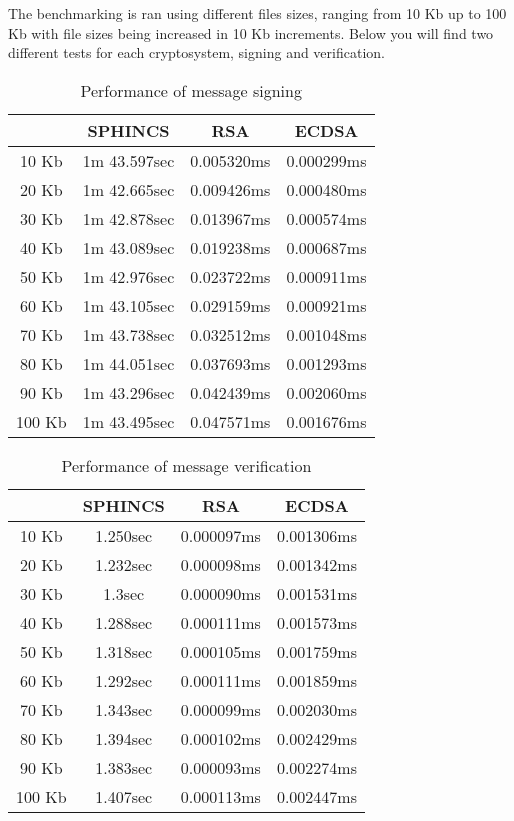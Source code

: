 \documentclass[]{scrartcl}
\begin{document}
The benchmarking is ran using different files sizes, ranging from 10 Kb up to 100 Kb with file sizes being increased in 10 Kb increments. Below you will find two different tests for each cryptosystem, signing and verification.

\begin{table} [H]
	\centering
	\caption{Performance of message signing}
	\begin{tabular}{|c|c|c|c|}
		\hline 
		& SPHINCS & RSA & ECDSA \\ 
		\hline 
		10 Kb & 1m 43.597sec & 0.005320ms & 0.000299ms \\ 
		\hline 
		20 Kb & 1m 42.665sec & 0.009426ms & 0.000480ms \\ 
		\hline 
		30 Kb & 1m 42.878sec & 0.013967ms & 0.000574ms \\ 
		\hline 
		40 Kb & 1m 43.089sec & 0.019238ms & 0.000687ms \\ 
		\hline 
		50 Kb & 1m 42.976sec & 0.023722ms & 0.000911ms \\ 
		\hline 
		60 Kb & 1m 43.105sec & 0.029159ms & 0.000921ms \\ 
		\hline 
		70 Kb & 1m 43.738sec & 0.032512ms & 0.001048ms \\ 
		\hline 
		80 Kb & 1m 44.051sec & 0.037693ms & 0.001293ms \\ 
		\hline 
		90 Kb & 1m 43.296sec & 0.042439ms & 0.002060ms \\ 
		\hline 
		100 Kb & 1m 43.495sec & 0.047571ms & 0.001676ms \\ 
		\hline 
	\end{tabular} 
\end{table}

\begin{table} [H]
	\centering
	\caption{Performance of message verification}
	\begin{tabular}{|c|c|c|c|}
		\hline 
		& SPHINCS & RSA & ECDSA \\ 
		\hline 
		10 Kb & 1.250sec & 0.000097ms & 0.001306ms \\ 
		\hline 
		20 Kb & 1.232sec & 0.000098ms & 0.001342ms \\ 
		\hline 
		30 Kb & 1.3sec & 0.000090ms & 0.001531ms \\ 
		\hline 
		40 Kb & 1.288sec & 0.000111ms & 0.001573ms \\ 
		\hline 
		50 Kb & 1.318sec & 0.000105ms & 0.001759ms \\ 
		\hline 
		60 Kb & 1.292sec & 0.000111ms & 0.001859ms \\ 
		\hline 
		70 Kb & 1.343sec & 0.000099ms & 0.002030ms \\ 
		\hline 
		80 Kb & 1.394sec & 0.000102ms & 0.002429ms \\ 
		\hline 
		90 Kb & 1.383sec & 0.000093ms & 0.002274ms \\ 
		\hline 
		100 Kb & 1.407sec & 0.000113ms & 0.002447ms \\ 
		\hline 
	\end{tabular} 
\end{table}
\end{document}
